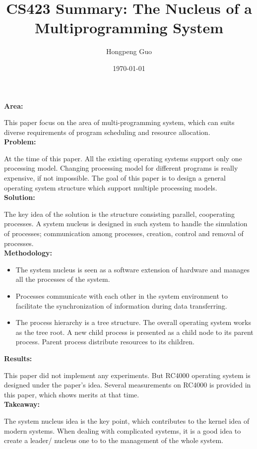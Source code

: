 \documentclass[10pt]{article}
\title{CS423 Summary: The Nucleus of a Multiprogramming System}
\author{Hongpeng Guo}
\date{\today}
\begin{document}
\maketitle

\noindent
{\bf Area:}

This paper focus on the area of multi-programming system, which can suits diverse requirements of program scheduling and resource allocation.
\\
\noindent
{\bf Problem:}

At the time of this paper. All the existing operating systems support only one processing model. Changing processing model for different programs is really expensive, if not impossible. The goal of this paper is to design a general operating system structure which support multiple processing models.
\\
\noindent
{\bf Solution:}

The key idea of the solution is the structure consisting parallel, cooperating processes. A system nucleus is designed in such system to handle the simulation of processes; communication among processes, creation, control and removal of processes.
\\
\noindent
{\bf Methodology:}

\begin{itemize}
\item
The system nucleus is seen as a software extension of hardware and manages all the processes of the system.
\item
Processes communicate with each other in the system environment to facilitate the synchronization of information during data transferring.
\item
The process hierarchy is a tree structure. The overall operating system works as the tree root. A new child process is presented as a child node to its parent process. Parent process distribute resources to its children.
\end{itemize}

\noindent
{\bf Results:}

This paper did not implement any experiments. But RC4000 operating system is designed under the paper's idea. Several measurements on RC4000 is provided in this paper, which shows merits at that time.
\\
\noindent
{\bf Takeaway:}

The system nucleus idea is the key point, which contributes to the kernel idea of modern systems. When dealing with complicated systems, it is a good idea to create a leader/ nucleus one to to the management of the whole system.
\end{document}
